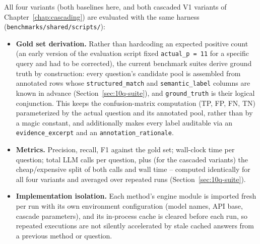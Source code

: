 All four variants (both baselines here, and both cascaded V1 variants of
Chapter~\ref{chap:cascading}) are evaluated with the same harness
(\texttt{benchmarks/shared/scripts/}):
\begin{itemize}
  \item \textbf{Gold set derivation.} Rather than hardcoding an expected
        positive count (an early version of the evaluation script fixed
        \texttt{actual\_p = 11} for a specific query and had to be
        corrected), the current benchmark suites derive ground truth by
        construction: every question's candidate pool is assembled from
        annotated rows whose \texttt{structured\_match} and
        \texttt{semantic\_label} columns are known in advance
        (Section~\ref{sec:10q-suite}), and \texttt{ground\_truth} is
        their logical conjunction. This keeps the confusion-matrix
        computation (TP, FP, FN, TN) parameterized by the actual
        question and its annotated pool, rather than by a magic
        constant, and additionally makes every label auditable via an
        \texttt{evidence\_excerpt} and an \texttt{annotation\_rationale}.
  \item \textbf{Metrics.} Precision, recall, F1 against the gold set;
        wall-clock time per question; total LLM calls per question, plus
        (for the cascaded variants) the cheap/expensive split of both
        calls and wall time -- computed identically for all four
        variants and averaged over repeated runs
        (Section~\ref{sec:10q-suite}).
  \item \textbf{Implementation isolation.} Each method's engine module is
        imported fresh per run with its own environment configuration
        (model names, API base, cascade parameters), and its in-process
        cache is cleared before each run, so repeated executions are not
        silently accelerated by stale cached answers from a previous
        method or question.
\end{itemize}

